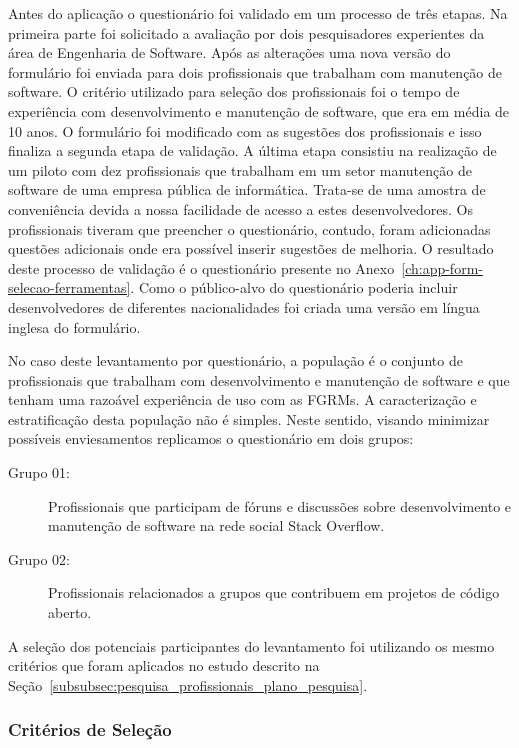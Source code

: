 Antes do aplicação o questionário foi validado em um processo de três etapas. Na
primeira parte foi solicitado a avaliação por dois pesquisadores experientes da
área de Engenharia de Software. Após as alterações uma nova versão do formulário
foi enviada para dois profissionais que trabalham com manutenção de software. O
critério utilizado para seleção dos profissionais foi o tempo de experiência com
desenvolvimento e manutenção de software, que era em média de 10 anos. O
formulário foi modificado com as sugestões dos profissionais e isso finaliza a
segunda etapa de validação. A última etapa consistiu na realização de um piloto
com dez profissionais que trabalham em um setor manutenção de software de uma
empresa pública de informática. Trata-se de uma amostra de conveniência devida a
nossa facilidade de acesso a estes desenvolvedores. Os profissionais tiveram que
preencher o questionário, contudo, foram adicionadas questões adicionais onde
era possível inserir sugestões de melhoria. O resultado deste processo de
validação é o questionário presente no
Anexo~\ref{ch:app-form-selecao-ferramentas}. Como o público-alvo do questionário
poderia incluir desenvolvedores de diferentes nacionalidades foi criada uma
versão em língua inglesa do formulário.

No caso deste levantamento por questionário, a população é o conjunto de
profissionais que trabalham com desenvolvimento e manutenção de software e que
tenham uma razoável experiência de uso com as FGRMs. A caracterização e
estratificação desta população não é simples. Neste sentido, visando minimizar
possíveis enviesamentos replicamos o questionário em dois grupos:

\begin{description}
	\item[Grupo 01:] Profissionais que participam de fóruns e discussões sobre
		desenvolvimento e manutenção de software na rede social Stack Overflow.
	\item[Grupo 02:] Profissionais relacionados a grupos que contribuem em
		projetos de código aberto.
\end{description}

A seleção dos potenciais participantes do levantamento foi utilizando os mesmo
critérios que foram aplicados no estudo descrito na
Seção~\ref{subsubsec:pesquisa_profissionais_plano_pesquisa}.

\subsubsection{Critérios de Seleção}
\label{ssub:metodologia_criterios_selecao}


